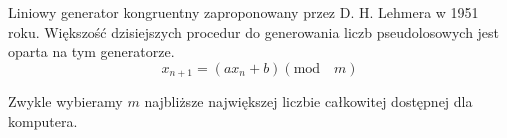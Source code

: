 \documentclass[12pt]{mwart}
\begin{document}
 	\noindent Liniowy generator kongruentny zaproponowany przez D. H. Lehmera w 1951 roku. Większość dzisiejszych procedur do generowania liczb pseudolosowych jest oparta na tym generatorze. 
 	$$x_{n+1} =(ax_n + b)(\mathrm{mod} \quad m)$$ 
 	
 	\noindent Zwykle wybieramy $m$ najbliższe największej liczbie całkowitej dostępnej dla komputera.
 	
 	\begin{figure} [H]
 		\centering 
 	\end{figure}
\end{document}
